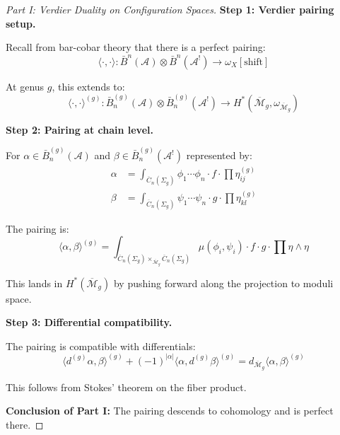 \begin{proof}[Part I: Verdier Duality on Configuration Spaces]

\textbf{Step 1: Verdier pairing setup.}

Recall from bar-cobar theory that there is a perfect pairing:
\begin{equation}
\langle \cdot, \cdot \rangle: \bar{B}^n(\mathcal{A}) \otimes \bar{B}^n(\mathcal{A}^!) \to \omega_X[\text{shift}]
\end{equation}

At genus $g$, this extends to:
\begin{equation}
\langle \cdot, \cdot \rangle^{(g)}: \bar{B}^{(g)}_n(\mathcal{A}) \otimes \bar{B}^{(g)}_n(\mathcal{A}^!) \to H^*(\overline{\mathcal{M}}_g, \omega_{\overline{\mathcal{M}}_g})
\end{equation}

\textbf{Step 2: Pairing at chain level.}

For $\alpha \in \bar{B}^{(g)}_n(\mathcal{A})$ and $\beta \in \bar{B}^{(g)}_n(\mathcal{A}^!)$ represented by:
\begin{align}
\alpha &= \int_{\overline{C}_n(\Sigma_g)} \phi_1 \cdots \phi_n \cdot f \cdot \prod \eta_{ij}^{(g)}\\
\beta &= \int_{\overline{C}_n(\Sigma_g)} \psi_1 \cdots \psi_n \cdot g \cdot \prod \eta_{kl}^{(g)}
\end{align}

The pairing is:
\begin{equation}
\langle \alpha, \beta \rangle^{(g)} = \int_{\overline{C}_n(\Sigma_g) \times_{\overline{\mathcal{M}}_g} \overline{C}_n(\Sigma_g)} \mu(\phi_i, \psi_i) \cdot f \cdot g \cdot \prod \eta \wedge \eta
\end{equation}

This lands in $H^*(\overline{\mathcal{M}}_g)$ by pushing forward along the projection to moduli space.

\textbf{Step 3: Differential compatibility.}

The pairing is compatible with differentials:
\begin{equation}
\langle d^{(g)}\alpha, \beta \rangle^{(g)} + (-1)^{|\alpha|}\langle \alpha, d^{(g)}\beta \rangle^{(g)} = d_{\overline{\mathcal{M}}_g}\langle \alpha, \beta \rangle^{(g)}
\end{equation}

This follows from Stokes' theorem on the fiber product.

\textbf{Conclusion of Part I:} The pairing descends to cohomology and is perfect there.
\end{proof}

